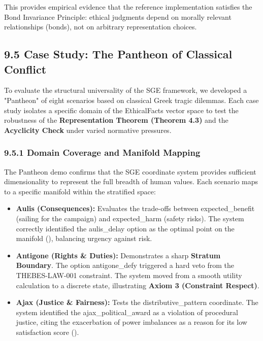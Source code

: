 \documentclass[12pt]{article}
\theoremstyle{plain}
\theoremstyle{definition}
\theoremstyle{remark}
\begin{document}
This provides empirical evidence that the reference implementation
satisfies the Bond Invariance Principle: ethical judgments depend on
morally relevant relationships (bonds), not on arbitrary representation
choices.

\subsection{9.5 Case Study: The Pantheon of Classical
Conflict}\label{case-study-the-pantheon-of-classical-conflict}

To evaluate the structural universality of the SGE framework, we
developed a "Pantheon" of eight scenarios based on classical Greek
tragic dilemmas. Each case study isolates a specific domain of the
EthicalFacts vector space to test the robustness of the
\textbf{Representation Theorem (Theorem 4.3)} and the \textbf{Acyclicity
Check} under varied normative pressures.

\subsubsection{9.5.1 Domain Coverage and Manifold
Mapping}\label{domain-coverage-and-manifold-mapping}

The Pantheon demo confirms that the SGE coordinate system provides
sufficient dimensionality to represent the full breadth of human values.
Each scenario maps to a specific manifold within the stratified space:

\begin{itemize}
\item
  \textbf{Aulis (Consequences):} Evaluates the trade-offs between
  expected\_benefit (sailing for the campaign) and expected\_harm
  (safety risks). The system correctly identified the aulis\_delay
  option as the optimal point on the manifold (), balancing urgency
  against risk.
\item
  \textbf{Antigone (Rights \& Duties):} Demonstrates a sharp
  \textbf{Stratum Boundary}. The option antigone\_defy triggered a hard
  veto from the THEBES-LAW-001 constraint. The system moved from a
  smooth utility calculation to a discrete state, illustrating
  \textbf{Axiom 3 (Constraint Respect)}.
\item
  \textbf{Ajax (Justice \& Fairness):} Tests the distributive\_pattern
  coordinate. The system identified the ajax\_political\_award as a
  violation of procedural justice, citing the exacerbation of power
  imbalances as a reason for its low satisfaction score ().
\end{itemize}
\end{document}

